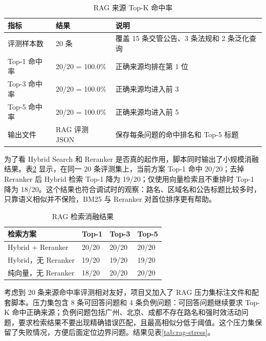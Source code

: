 \documentclass[bwprint]{report}
\begin{document}
\begin{table}[H]
    \caption{RAG 来源 Top-K 命中率}
    \label{tab:rag-eval}
    \centering
    \begin{tabular}{p{}p{}p{}}
        \toprule[1.5pt]
        指标 & 结果 & 说明 \\
        \midrule[1pt]
        评测样本数 & 20 条 & 覆盖 15 条交管公告、3 条法规和 2 条泛化查询 \\
        Top-1 命中率 & 20/20 = 100.0\% & 正确来源均排在第 1 位 \\
        Top-3 命中率 & 20/20 = 100.0\% & 正确来源均进入前 3 \\
        Top-5 命中率 & 20/20 = 100.0\% & 正确来源均进入前 5 \\
        输出文件 & RAG 评测 JSON & 保存每条问题的命中排名和 Top-5 标题 \\
        \bottomrule[1.5pt]
    \end{tabular}
\end{table}

为了看 Hybrid Search 和 Reranker 是否真的起作用，脚本同时输出了小规模消融结果。表\ref{tab:rag-ablation} 显示，在同一 20 条评测集上，当前方案 Top-1 命中 20/20；去掉 Reranker 后 Hybrid 检索 Top-1 降为 19/20；仅使用向量检索且不重排时 Top-1 降为 18/20。这个结果也符合调试时的观察：路名、区域名和公告标题比较多时，只靠语义相似并不保险，BM25 与 Reranker 对首位排序更有帮助。

\begin{table}[H]
    \caption{RAG 检索消融结果}
    \label{tab:rag-ablation}
    \centering
    \small
    \begin{tabular}{p{}p{}p{}p{}}
        \toprule[1.5pt]
        检索方案 & Top-1 & Top-3 & Top-5 \\
        \midrule[1pt]
        Hybrid + Reranker & 20/20 & 20/20 & 20/20 \\
        Hybrid，无 Reranker & 19/20 & 19/20 & 19/20 \\
        纯向量，无 Reranker & 18/20 & 20/20 & 20/20 \\
        \bottomrule[1.5pt]
    \end{tabular}
\end{table}

考虑到 20 条来源命中率评测相对友好，项目又加入了 RAG 压力集标注文件和配套脚本。压力集包含 8 条可回答问题和 4 条负例问题：可回答问题继续要求 Top-K 命中正确来源；负例问题包括广州、北京、成都不存在路名和强时效活动问题，要求检索结果不要出现精确错误匹配，且最高相似分低于阈值。这个压力集保留了失败情况，方便后面定位边界问题。结果见表\ref{tab:rag-stress}。
\end{document}
